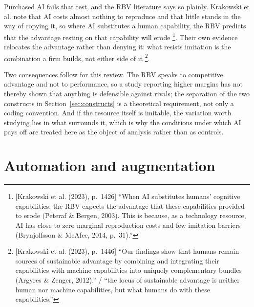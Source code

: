Purchased AI fails that test, and the RBV literature says so plainly. Krakowski et al.
note that AI costs almost nothing to reproduce and that little stands in the way of
copying it, so where AI substitutes a human capability, the RBV predicts that the
advantage resting on that capability will
erode \parencite[p.~1426]{krakowski2023artificial}\footnote{[Krakowski et al.
(2023), p.~1426] ``When AI substitutes humans' cognitive capabilities, the RBV expects
the advantage that these capabilities provided to erode (Peteraf \& Bergen, 2003). This
is because, as a technology resource, AI has close to zero marginal reproduction costs
and few imitation barriers (Brynjolfsson \& McAfee, 2014, p.~31).''}. Their own evidence
relocates the advantage rather than denying it: what resists imitation is the combination
a firm builds, not either side of
it \parencite[p.~1446]{krakowski2023artificial}\footnote{[Krakowski et al. (2023),
p.~1446] ``Our findings show that humans remain sources of sustainable advantage by
combining and integrating their capabilities with machine capabilities into uniquely
complementary bundles (Argyres \& Zenger, 2012).'' / ``the locus of sustainable advantage
is neither human nor machine capabilities, but what humans do with these capabilities.''}.

Two consequences follow for this review. The RBV speaks to competitive advantage and not
to performance, so a study reporting higher margins has not thereby shown that anything
is defensible against rivals; the separation of the two constructs in
Section~\ref{sec:constructs} is a theoretical requirement, not only a coding convention.
And if the resource itself is imitable, the variation worth studying lies in what
surrounds it, which is why the conditions under which AI pays off are treated here as the
object of analysis rather than as controls.

\section{Automation and augmentation}
\label{sec:autoaug}

